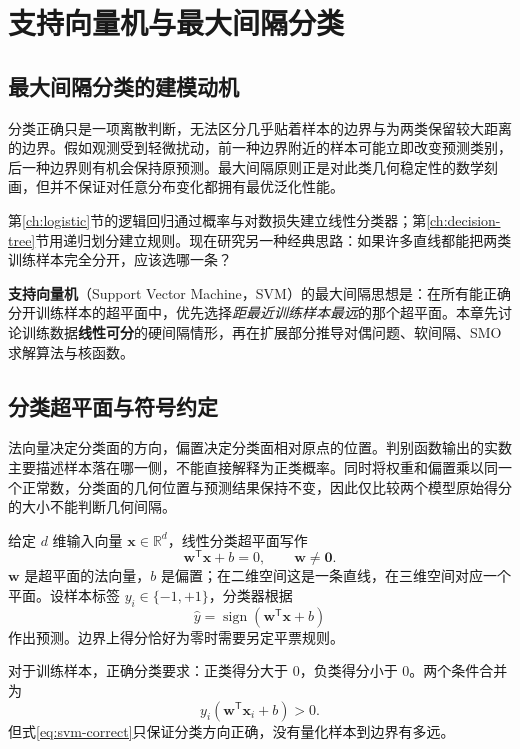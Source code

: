 \section{支持向量机与最大间隔分类}\label{ch:svm}

\subsection{最大间隔分类的建模动机}

分类正确只是一项离散判断，无法区分几乎贴着样本的边界与为两类保留较大距离的边界。假如观测受到轻微扰动，前一种边界附近的样本可能立即改变预测类别，后一种边界则有机会保持原预测。最大间隔原则正是对此类几何稳定性的数学刻画，但并不保证对任意分布变化都拥有最优泛化性能。

第\ref{ch:logistic}节的逻辑回归通过概率与对数损失建立线性分类器；第\ref{ch:decision-tree}节用递归划分建立规则。现在研究另一种经典思路：如果许多直线都能把两类训练样本完全分开，应该选哪一条？

\textbf{支持向量机}（Support Vector Machine，SVM）的最大间隔思想是：在所有能正确分开训练样本的超平面中，优先选择\emph{距最近训练样本最远}的那个超平面\cite[第6章]{zhou2016}\cite[第7章]{lihang2019}。本章先讨论训练数据\textbf{线性可分}的硬间隔情形，再在扩展部分推导对偶问题、软间隔、SMO 求解算法与核函数。

\subsection{分类超平面与符号约定}

法向量决定分类面的方向，偏置决定分类面相对原点的位置。判别函数输出的实数主要描述样本落在哪一侧，不能直接解释为正类概率。同时将权重和偏置乘以同一个正常数，分类面的几何位置与预测结果保持不变，因此仅比较两个模型原始得分的大小不能判断几何间隔。

给定 $d$ 维输入向量 $\boldsymbol x\in\mathbb R^d$，线性分类超平面写作
\begin{equation}\label{eq:svm-hyperplane}
\boldsymbol w^{\mathsf T}\boldsymbol x+b=0,\qquad
\boldsymbol w\ne\boldsymbol0.
\end{equation}
$\boldsymbol w$ 是超平面的法向量，$b$ 是偏置；在二维空间这是一条直线，在三维空间对应一个平面。设样本标签 $y_i\in\{-1,+1\}$，分类器根据
\[
\hat y=\operatorname{sign}(\boldsymbol w^{\mathsf T}\boldsymbol x+b)
\]
作出预测。边界上得分恰好为零时需要另定平票规则。

对于训练样本，正确分类要求：正类得分大于 $0$，负类得分小于 $0$。两个条件合并为
\begin{equation}\label{eq:svm-correct}
y_i(\boldsymbol w^{\mathsf T}\boldsymbol x_i+b)>0.
\end{equation}
但式\eqref{eq:svm-correct}只保证分类方向正确，没有量化样本到边界有多远。

